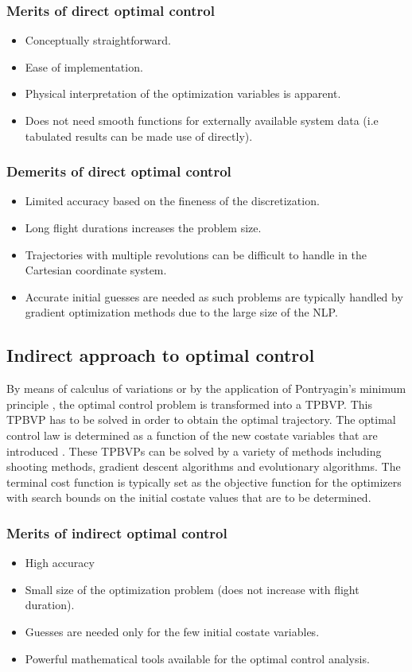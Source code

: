\subsubsection{Merits of direct optimal control}
\begin{itemize}
	\item Conceptually straightforward.
	\item Ease of implementation.
	\item Physical interpretation of the optimization variables is apparent.
	\item Does not need smooth functions for externally available system data (i.e tabulated results can be made use of directly).
\end{itemize}
\subsubsection{Demerits of direct optimal control}
\begin{itemize}
	\item Limited accuracy based on the fineness of the discretization.
	\item Long flight durations increases the problem size.
	\item Trajectories with multiple revolutions can be difficult to handle in the Cartesian coordinate system.
	\item Accurate initial guesses are needed as such problems are typically handled by gradient optimization methods due to the large size of the NLP.
\end{itemize}
\subsection{Indirect approach to optimal control}
By means of calculus of variations or by the application of Pontryagin's minimum principle \citep{lev_semenovich_mathematical_1987}, the optimal control problem is transformed into a TPBVP. This TPBVP has to be solved in order to obtain the optimal trajectory. The optimal control law is determined as a function of the new costate variables that are introduced \citep{kirk_optimal_2012}. These TPBVPs can be solved by a variety of methods including shooting methods, gradient descent algorithms and evolutionary algorithms. The terminal cost function is typically set as the objective function for the optimizers with search bounds on the initial costate values that are to be determined.
\subsubsection{Merits of indirect optimal control}
\begin{itemize}
	\item High accuracy
	\item Small size of the optimization problem (does not increase with flight duration).
	\item Guesses are needed only for the few initial costate variables.
	\item Powerful mathematical tools available for the optimal control analysis.
\end{itemize}
